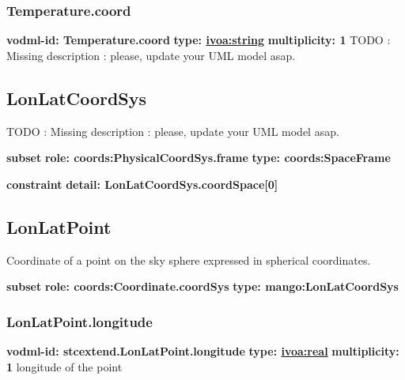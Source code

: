     \subsubsection{Temperature.coord}
      \textbf{vodml-id: Temperature.coord} \newline
      \textbf{type: \hyperref[sect:ivoa]{ivoa:string}} \newline
      \textbf{multiplicity: 1} \newline 
      TODO : Missing description : please, update your UML model asap.

  \subsection{LonLatCoordSys}
  \label{sect:stcextend.LonLatCoordSys}
    TODO : Missing description : please, update your UML model asap.

    \noindent \textbf{subset} \newline
    \indent   \textbf{role: coords:PhysicalCoordSys.frame} \newline
    \indent   \textbf{type: coords:SpaceFrame} \newline


    \noindent \textbf{constraint} \newline
    \indent    \textbf{detail: LonLatCoordSys.coordSpace[0] }\newline


  \subsection{LonLatPoint}
  \label{sect:stcextend.LonLatPoint}
    Coordinate of a point on the sky sphere expressed in spherical coordinates.

    \noindent \textbf{subset} \newline
    \indent   \textbf{role: coords:Coordinate.coordSys} \newline
    \indent   \textbf{type: mango:LonLatCoordSys} \newline


    \subsubsection{LonLatPoint.longitude}
      \textbf{vodml-id: stcextend.LonLatPoint.longitude} \newline
      \textbf{type: \hyperref[sect:ivoa]{ivoa:real}} \newline
      \textbf{multiplicity: 1} \newline 
      longitude of the point

